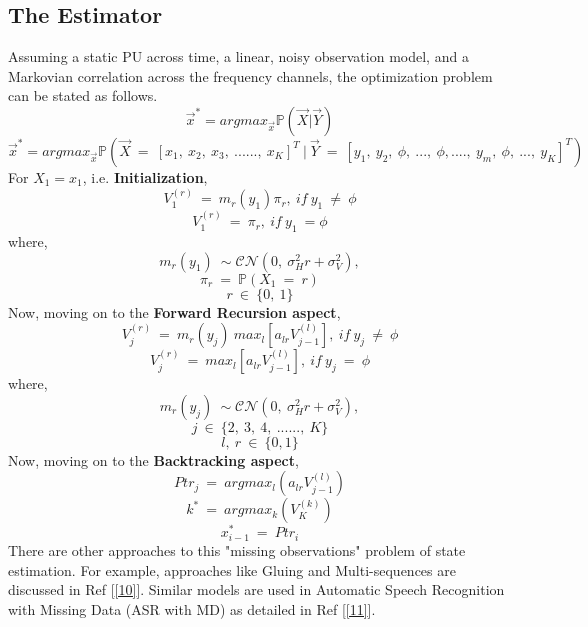 \documentclass[12pt, draftcls, onecolumn]{IEEEtran}
\begin{document}
\subsection{The Estimator}
Assuming a static PU across time, a linear, noisy observation model, and a Markovian correlation across the frequency channels, the optimization problem can be stated as follows.
\begin{equation}\label{32}
    \vec{x}^* = argmax_{\vec{x}} \mathbb P(\vec{X}|\vec{Y})
\end{equation}
\[\vec{x}^* = argmax_{\vec{x}} \mathbb P(\vec{X}\ =\ [x_1,\ x_2,\ x_3,\ ......,\ x_K]^T\ |\ \vec{Y}\ =\ [y_1,\ y_2,\ \phi,\ ...,\ \phi,....,\ y_m,\ \phi,\ ...,\ y_K]^T)\]
For $X_1 = x_1$, i.e. \textbf{Initialization},
\[V_1^{(r)}\ =\ m_r(y_1)\pi_r,\ if\ y_1\ \neq\ \phi\]
\[V_1^{(r)}\ =\ \pi_r,\ if\ y_1\ = \phi\]
where,
\[m_r(y_1)\ \sim \mathcal{CN}(0,\ \sigma_H^2r+\sigma_V^2),\]
\[\pi_r\ =\ \mathbb{P}(X_1\ =\ r)\]
\[r\ \in\ \{0,\ 1\}\]
Now, moving on to the \textbf{Forward Recursion aspect},
\[V_j^{(r)}\ =\ m_r(y_j)\ max_l[a_{lr}V_{j-1}^{(l)}],\ if\ y_j\ \neq\ \phi\]
\[V_j^{(r)}\ =\ max_l[a_{lr}V_{j-1}^{(l)}],\ if\ y_j\ =\ \phi\]
where,
\[m_r(y_j)\ \sim \mathcal{CN}(0,\ \sigma_H^2r+\sigma_V^2),\]
\[j\ \in\ \{2,\ 3,\ 4,\ ......,\ K\}\]
\[l,\ r\ \in\ \{0,1\}\]
Now, moving on to the \textbf{Backtracking aspect},
\[Ptr_j\ =\ argmax_l(a_{lr}V_{j-1}^{(l)})\]
\[k^*\ =\ argmax_k(V_K^{(k)})\]
\[x_{i-1}^*\ =\ Ptr_i\]
There are other approaches to this "missing observations" problem of state estimation. For example, approaches like Gluing and Multi-sequences are discussed in Ref [\ref{10}]. Similar models are used in Automatic Speech Recognition with Missing Data (ASR with MD) as detailed in Ref [\ref{11}].
\end{document}
